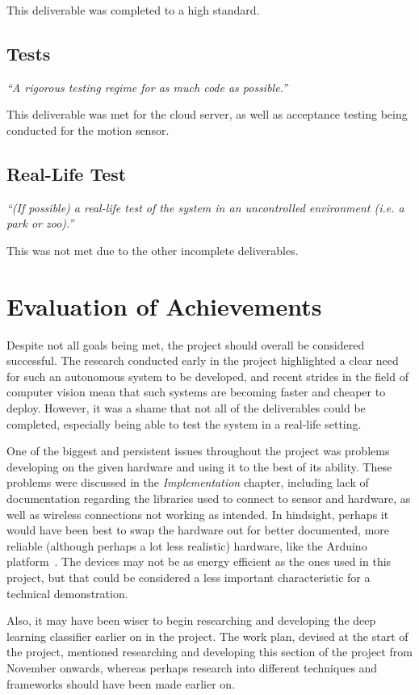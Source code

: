 \noindent
This deliverable was completed to a high standard.

\subsection{Tests}
\textit{``A rigorous testing regime for as much code as possible.''}

\noindent
This deliverable was met for the cloud server, as well as acceptance testing being conducted for the motion sensor.

\subsection{Real-Life Test}
\textit{``(If possible) a real-life test of the system in an uncontrolled
environment (i.e. a park or zoo).''}

\noindent
This was not met due to the other incomplete deliverables.

\section{Evaluation of Achievements}
Despite not all goals being met, the project should overall be considered
successful. The research conducted early in the project highlighted a clear
need for such an autonomous system to be developed, and recent strides in the
field of computer vision mean that such systems are becoming faster and
cheaper to deploy. However, it was a shame that not all of the deliverables
could be completed, especially being able to test the system in a real-life
setting.

One of the biggest and persistent issues throughout the project was problems
developing on the given hardware and using it to the best of its ability.
These problems were discussed in the \textit{Implementation} chapter,
including lack of documentation regarding the libraries used to connect to
sensor and hardware, as well as wireless connections not working as intended.
In hindsight, perhaps it would have been best to swap the hardware out for
better documented, more reliable (although perhaps a lot less realistic)
hardware, like the Arduino platform~\cite{arduino}. The devices may not be as
energy efficient as the ones used in this project, but that could be
considered a less important characteristic for a technical demonstration.

Also, it may have been wiser to begin researching and developing the deep
learning classifier earlier on in the project. The work plan, devised at the
start of the project, mentioned researching and developing this section of
the project from November onwards, whereas perhaps research into different
techniques and frameworks should have been made earlier on.

